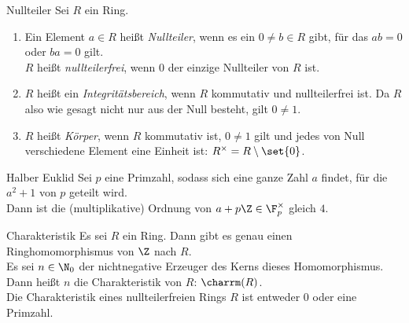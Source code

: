 \begin{karte}{Nullteiler}
    Sei \(R\) ein Ring.
    \begin{enumerate}
        \item Ein Element \(a\in R\) heißt \textit{Nullteiler}, 
        wenn es ein \(0\neq b\in R\) gibt, für das \(ab=0\) oder 
        \(ba = 0\) gilt. \\
        \(R\) heißt \textit{nullteilerfrei}, wenn \(0\) der einzige 
        Nullteiler von \(R\) ist.
        \item \(R\) heißt ein \textit{Integritätsbereich}, wenn \(R\) 
        kommutativ und nullteilerfrei ist. Da \(R\) also wie gesagt 
        nicht nur aus der Null besteht, gilt \(0\neq 1\).
        \item \(R\) heißt \textit{Körper}, wenn \(R\) kommutativ ist, 
        \(0\neq 1\) gilt und jedes von Null verschiedene Element 
        eine Einheit ist: \(R^\times = R \setminus \set{0}\).
    \end{enumerate}
\end{karte}

\begin{karte}{Halber Euklid}
    Sei \(p\) eine Primzahl, sodass sich eine ganze Zahl \(a\) findet, 
    für die \(a^2 + 1\) von \(p\) geteilt wird. \\
    Dann ist die (multiplikative) Ordnung von \(a + p\Z \in \F_p^\times\)
    gleich \(4\).
\end{karte}

\begin{karte}{Charakteristik}
    Es sei \(R\) ein Ring. Dann gibt es genau einen 
    Ringhomomorphismus von \(\Z\) nach \(R\).\\
    Es sei \(n\in \N_0\) der nichtnegative Erzeuger 
    des Kerns dieses Homomorphismus. Dann heißt \(n\)
    die Charakteristik von \(R\): \(\charrm(R)\).\\
    Die Charakteristik eines nullteilerfreien Rings \(R\) 
    ist entweder \(0\) oder eine Primzahl.
\end{karte}

